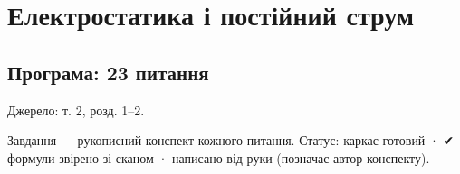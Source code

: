 \documentclass[11pt,a4paper,oneside]{book}
\newcommand{\ok}{{\sffamily\color{green!45!black}✔}}
\begin{document}
\tableofcontents

\mainmatter

\part{Електростатика і постійний струм}

\chapter*{Програма: 23 питання}


Джерело: т. 2, розд. 1–2.

Завдання — рукописний конспект кожного питання. Статус:  каркас готовий · \ok{} формули звірено зі сканом ·  написано від руки (позначає автор конспекту).
\end{document}
